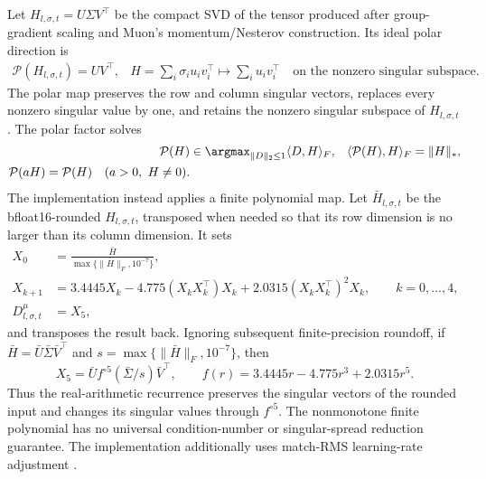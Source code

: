 \documentclass{article}
\begin{document}
Let $H_{l,\sigma,t}=U\Sigma V^\top$ be the compact SVD of the tensor produced
after group-gradient scaling and Muon's momentum/Nesterov construction.  Its
ideal polar direction is
\begin{equation}
\begin{aligned}
    \mathcal{P}(H_{l,\sigma,t})=UV^\top,
    &
    H=\sum_i\sigma_i u_iv_i^\top
    \mapsto
    \sum_i u_iv_i^\top
    \quad\text{on the nonzero singular subspace}.
\end{aligned}
    \label{eq:appendix-polar-map}
\end{equation}
The polar map preserves the row and column singular vectors, replaces every
nonzero singular value by one, and retains the nonzero singular subspace of
$H_{l,\sigma,t}$.  The polar factor solves
\begin{equation}
\begin{aligned}
    \mathcal{P}(H)
    &\in
    \argmax_{\lVert D\rVert_2\le 1}\langle D,H\rangle_F,
    &
    \langle\mathcal{P}(H),H\rangle_F
    &=\lVert H\rVert_*,
    \\
    \mathcal{P}(aH)=\mathcal{P}(H)
    \quad(a>0,\ H\ne0).
\end{aligned}
    \label{eq:appendix-polar-steepest}
\end{equation}
The implementation instead applies a finite polynomial map.  Let
$\bar H_{l,\sigma,t}$ be the bfloat16-rounded $H_{l,\sigma,t}$, transposed when
needed so that its row dimension is no larger than its column dimension.  It sets
\begin{equation}
\begin{aligned}
    X_0
    &=
    \frac{\bar H}{\max\{\lVert \bar H\rVert_F,10^{-7}\}},
    \\
    X_{k+1}
    &=
    3.4445X_k
    -4.775(X_kX_k^\top)X_k
    +2.0315(X_kX_k^\top)^2X_k,
    \qquad k=0,\ldots,4,
    \\
    D^\mu_{l,\sigma,t}
    &=X_5,
\end{aligned}
    \label{eq:appendix-muon-ns5}
\end{equation}
and transposes the result back.  Ignoring subsequent finite-precision roundoff,
if $\bar H=\bar U\bar\Sigma\bar V^\top$ and
$s=\max\{\lVert\bar H\rVert_F,10^{-7}\}$, then
\begin{equation}
    X_5
    =
    \bar U f^{\circ5}(\bar\Sigma/s)\bar V^\top,
    \qquad
    f(r)=3.4445r-4.775r^3+2.0315r^5.
    \label{eq:appendix-muon-spectral-action}
\end{equation}
Thus the real-arithmetic recurrence preserves the singular vectors of the
rounded input and changes its singular values through $f^{\circ5}$.  The
nonmonotone finite polynomial has no universal condition-number or
singular-spread reduction guarantee.  The implementation additionally uses
match-RMS learning-rate adjustment \citep{liu2025muon}.
\end{document}
